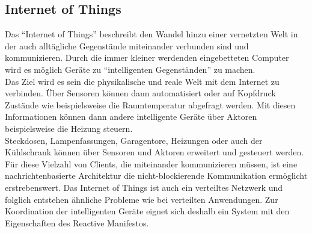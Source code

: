 \subsection{Internet of Things}
Das \enquote{Internet of Things} beschreibt den Wandel hinzu einer vernetzten Welt in der auch alltägliche Gegenstände miteinander verbunden sind und kommunizieren. Durch die immer kleiner werdenden eingebetteten Computer wird es möglich Geräte zu \enquote{intelligenten Gegenständen} zu machen.\\
Das Ziel wird es sein die physikalische und reale Welt mit dem Internet zu verbinden. Über Sensoren können dann automatisiert oder auf Kopfdruck Zustände wie beispielsweise die Raumtemperatur abgefragt werden. Mit diesen Informationen können dann andere intelligente Geräte über Aktoren beispielsweise die Heizung steuern.\\
Steckdosen, Lampenfassungen, Garagentore, Heizungen oder auch der Kühlschrank können über Sensoren und Aktoren erweitert und gesteuert werden.\\

Für diese Vielzahl von Clients, die miteinander kommunizieren müssen, ist eine nachrichtenbasierte Architektur die nicht-blockierende Kommunikation ermöglicht erstrebenswert. Das Internet of Things ist auch ein verteiltes Netzwerk und folglich entstehen ähnliche Probleme wie bei verteilten Anwendungen. Zur Koordination der intelligenten Geräte eignet sich deshalb ein System mit den Eigenschaften des Reactive Manifestos. 


\pagebreak

